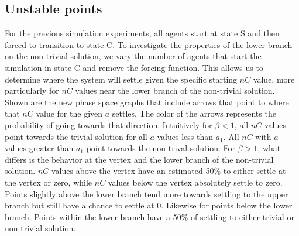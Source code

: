 \subsection{Unstable points}
For the previous simulation experiments, all agents start at state S and then forced to transition to state C. To investigate the properties of the lower branch on the non-trivial solution, we vary the number of agents that start the simulation in state C and remove the forcing function. This allows us to determine where the system will settle given the specific starting $nC$ value, more particularly for $nC$ values near the lower branch of the non-trivial solution. Shown are the new phase space graphs that include arrows that point to where that $nC$ value for the given $\bar{a}$ settles.
The color of the arrows represents the probability of going towards that direction.
Intuitively for $\beta < 1$, all $nC$ values point towards the trivial solution for all $\bar{a}$ values less than  $\bar{a}_{1}$. 
All $nC$ with $\bar{a}$ values greater than $\bar{a}_{1}$ point towards the non-trival solution.
For $\beta > 1$, what differs is the behavior at the vertex and the lower branch of the non-trivial solution.
$nC$ values above the vertex have an estimated 50\% to either settle at the vertex or zero, while $nC$ values below the vertex absolutely settle to zero.
Points slightly above the lower branch tend more towards settling to the upper branch but still have a chance to settle at 0.
Likewise for points below the lower branch.
Points within the lower branch have a 50\% of settling to either trivial or non trivial solution.












